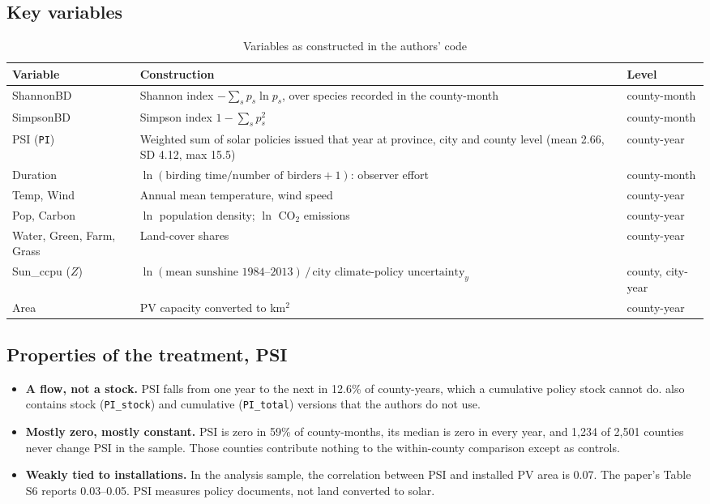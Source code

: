 \documentclass[11pt]{article}
\begin{document}
\subsection{Key variables}
\begin{table}[H]\centering\small
\caption{Variables as constructed in the authors' code}
\begin{tabularx}{\linewidth}{l>{\raggedright\arraybackslash}X l}
\toprule
Variable & Construction & Level \\
\midrule
ShannonBD & Shannon index $-\sum_s p_s\ln p_s$, over species recorded in the county-month & county-month\\
SimpsonBD & Simpson index $1-\sum_s p_s^2$ & county-month\\
PSI (\texttt{PI}) & Weighted sum of solar policies issued that year at province, city and county level (mean 2.66, SD 4.12, max 15.5) & county-year\\
Duration & $\ln(\text{birding time}/\text{number of birders}+1)$: observer effort & county-month\\
Temp, Wind & Annual mean temperature, wind speed & county-year\\
Pop, Carbon & $\ln$ population density; $\ln$ CO$_2$ emissions & county-year\\
Water, Green, Farm, Grass & Land-cover shares & county-year\\
Sun\_ccpu ($Z$) & $\ln(\text{mean sunshine }1984\text{--}2013)\,/\,\text{city climate-policy uncertainty}_y$ & county, city-year\\
Area & PV capacity converted to km$^2$ & county-year\\
\bottomrule
\end{tabularx}
\end{table}

\subsection{Properties of the treatment, PSI}
\begin{itemize}
\item \textbf{A flow, not a stock.} PSI falls from one year to the next in 12.6\% of county-years, which a cumulative policy stock cannot do.  also contains stock (\texttt{PI\_stock}) and cumulative (\texttt{PI\_total}) versions that the authors do not use.
\item \textbf{Mostly zero, mostly constant.} PSI is zero in 59\% of county-months, its median is zero in every year, and 1,234 of 2,501 counties never change PSI in the sample. Those counties contribute nothing to the within-county comparison except as controls.
\item \textbf{Weakly tied to installations.} In the analysis sample, the correlation between PSI and installed PV area is 0.07. The paper's Table S6 reports 0.03--0.05. PSI measures policy documents, not land converted to solar.
\end{itemize}
\end{document}
